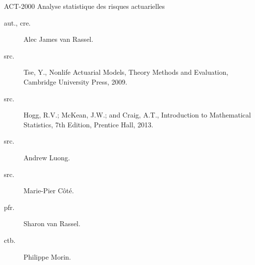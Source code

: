 \begin{contrib}{ACT-2000\: Analyse statistique des risques actuarielles}
\begin{description}
	\item[aut., cre.] Alec James van Rassel.
	\item[src.]	Tse, Y., Nonlife Actuarial Models, Theory Methods and Evaluation, Cambridge University Press, 2009.
	\item[src.]	Hogg, R.V.; McKean, J.W.; and Craig, A.T., Introduction to Mathematical Statistics, 7th Edition, Prentice Hall, 2013.
	\item[src.]	Andrew Luong.
	\item[src.]	Marie-Pier Côté.
	\item[pfr.]	Sharon van Rassel.
	\item[ctb.]	Philippe Morin.
\end{description}
\end{contrib}
